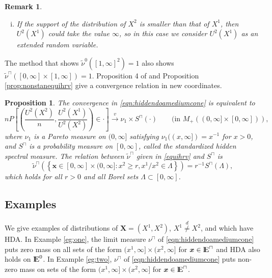 \documentclass[11 pt]{amsart}
\newtheorem{prop}[thm]{Proposition}
\newtheorem{rem}[thm]{Remark}
\numberwithin{equation}{section}
\begin{document}
{{\begin{rem}
{{\begin{enumerate}[(i)]
\item {I}f the support of the distribution of $X^2$ is smaller
  than that of $X^1$, then $U^2(X^1)$ could take the value
  $\infty$, {so in this case}
we consider $U^2(X^1)$ as an
  extended random variable.  
\end{enumerate}
}}
\end{rem}

{The method that shows} $\tilde \nu^0([1,
\infty]^2) = 1$ {also  shows} $\tilde \nu^{\sqcap}([0, \infty]
\times [1, \infty]) = 1$. Proposition 4 of
\cite{heffernan:resnick:2007} and Proposition
\ref{prop:nonstanequihrv} {give} {a}  convergence relation
{in new coordinates.}

\begin{prop}\label{prop:nonstandecomp}
{{ The convergence in \eqref{eqn:hiddendoamediumcone} is equivalent to
\begin{equation}\label{eqn:nonstandecomp}
nP\left[ \left( \frac{U^2\left(X^2\right)}{n} ,
    \frac{U^2(X^1)}{U^2(X^2)} \right) \in \cdot \right]
\stackrel{v}{\rightarrow} \nu_1 \times  S^{\sqcap}(\cdot)\qquad
(\text{in }M_+( (0, \infty] \times [0, \infty])),
\end{equation}
where $\nu_1$ is a Pareto measure
on $(0, \infty]$ satisfying $\nu_1((x, \infty]) = x^{-1}$
for $x > 0$, and $S^{\sqcap}$ is a probability measure on $[0,
\infty]$,
called the standardized hidden spectral
measure.  The relation between $\tilde \nu^{\sqcap}$
given in \eqref{equihrv} and $S^{\sqcap}$ is
 \begin{equation}\label{tildenusqcapandssqcap}
 \tilde \nu^{\sqcap} \left( \left \{ {\boldsymbol x} \in [0, \infty] \times (0, \infty] : x^2 \ge r, x^1/x^2 \in \Lambda \right \} \right) = r^{-1} S^{\sqcap}(\Lambda),
 \end{equation}
which holds for all $r >0$ and all Borel sets $\Lambda \subset [0, \infty]$.
}}
\end{prop}

\subsection{Examples} 
{We give} examples of distributions of ${\boldsymbol X}=(X^1,X^2)$,
{$X^1\stackrel{d}{\neq}X^2$}, and  which {have}
HDA.
 In {E}xample \ref{eg:one},
the limit measure $\nu^{\sqcap}$ of \eqref{eqn:hiddendoamediumcone}
puts zero mass {on} all sets of the form $(x^1, \infty] \times (x^2,
\infty]$ for ${\boldsymbol x} \in {\mathop{\rm I\kern -0.20em E}\nolimits}^{\sqcap}$ and  HDA also holds
on ${\mathop{\rm I\kern -0.20em E}\nolimits}^0$. In {E}xample {\ref{eg:two}},  $\nu^{\sqcap}$ of
\eqref{eqn:hiddendoamediumcone} puts non-zero mass {on} sets of the
form $(x^1, \infty] \times (x^2, \infty]$ for ${\boldsymbol x} \in
{\mathop{\rm I\kern -0.20em E}\nolimits}^{\sqcap}$. 

}}
\end{document}
